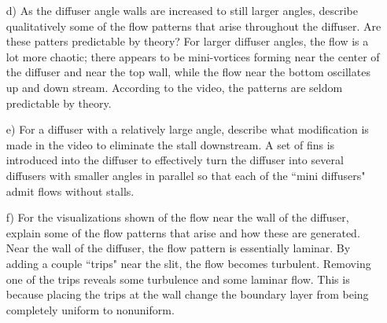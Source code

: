 \documentclass{article}
\begin{document}
\begin{itemize}
\begin{itemize}
        \item[d)] As the diffuser angle walls are increased to still larger angles, describe qualitatively some of the flow patterns that arise throughout the diffuser. Are these patters predictable by theory?
        \newline\newline
        For larger diffuser angles, the flow is a lot more chaotic; there appears to be mini-vortices forming near the center of the diffuser and near the top wall, while the flow near the bottom oscillates up and down stream. According to the video, the patterns are seldom predictable by theory.
        \newline\newline

        \item[e)] For a diffuser with a relatively large angle, describe what modification is made in the video to eliminate the stall downstream.
        \newline\newline
        A set of fins is introduced into the diffuser to effectively turn the diffuser into several diffusers with smaller angles in parallel so that each of the ``mini diffusers" admit flows without stalls.
        \newline\newline
        
        \item[f)] For the visualizations shown of the flow near the wall of the diffuser, explain some of the flow patterns that arise and how these are generated.
        \newline\newline
        Near the wall of the diffuser, the flow pattern is essentially laminar. By adding a couple ``trips" near the slit, the flow becomes turbulent. Removing one of the trips reveals some turbulence and some laminar flow. This is because placing the trips at the wall change the boundary layer from being completely uniform to nonuniform.
    \end{itemize}


    
\end{itemize}
\end{document}
